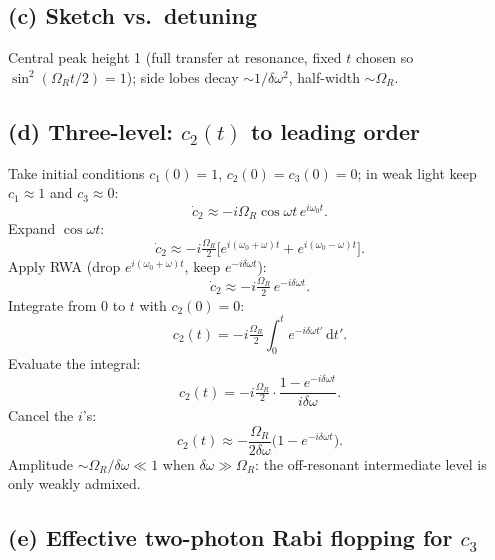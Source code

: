 \documentclass[11pt]{article}
\newcommand{\de}{\mathrm{d}}
\begin{document}
\subsection*{(c) Sketch vs.\ detuning}

\begin{center}
\end{center}

Central peak height 1 (full transfer at resonance, fixed $t$ chosen so $\sin^2(\Omega_R t/2)=1$); side lobes decay $\sim 1/\delta\omega^2$, half-width $\sim\Omega_R$.

\subsection*{(d) Three-level: $c_2(t)$ to leading order}

Take initial conditions $c_1(0)=1$, $c_2(0)=c_3(0)=0$; in weak light keep $c_1\approx 1$ and $c_3\approx 0$:
\[
\dot c_2 \approx -i\Omega_R\cos\omega t\,e^{i\omega_0 t}.
\]
Expand $\cos\omega t$:
\[
\dot c_2 \approx -i\tfrac{\Omega_R}{2}\bigl[e^{i(\omega_0+\omega)t}+e^{i(\omega_0-\omega)t}\bigr].
\]
Apply RWA (drop $e^{i(\omega_0+\omega)t}$, keep $e^{-i\delta\omega t}$):
\[
\dot c_2 \approx -i\tfrac{\Omega_R}{2}\,e^{-i\delta\omega t}.
\]
Integrate from $0$ to $t$ with $c_2(0)=0$:
\[
c_2(t) = -i\tfrac{\Omega_R}{2}\int_0^t e^{-i\delta\omega t'}\,\de t'.
\]
Evaluate the integral:
\[
c_2(t) = -i\tfrac{\Omega_R}{2}\cdot\frac{1-e^{-i\delta\omega t}}{i\delta\omega}.
\]
Cancel the $i$'s:
\[
\boxed{\;c_2(t) \approx -\frac{\Omega_R}{2\delta\omega}\bigl(1-e^{-i\delta\omega t}\bigr).\;}
\]
Amplitude $\sim\Omega_R/\delta\omega\ll 1$ when $\delta\omega\gg\Omega_R$: the off-resonant intermediate level is only weakly admixed.

\subsection*{(e) Effective two-photon Rabi flopping for $c_3$}
\end{document}
